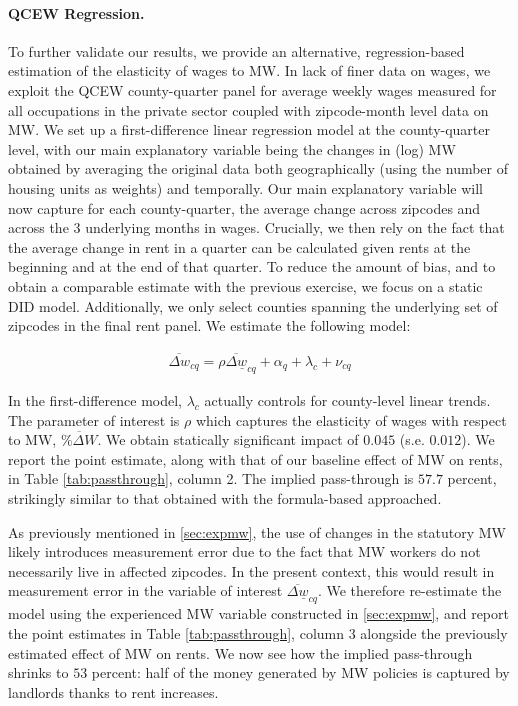 \paragraph{QCEW Regression.} To further validate our results, we provide an alternative, 
regression-based estimation of the elasticity of wages to MW. In lack of finer data on wages, 
we exploit the QCEW county-quarter panel for average weekly wages measured for all occupations 
in the private sector coupled with zipcode-month level data on MW. We set up a first-difference 
linear regression model at the county-quarter level, with our main explanatory variable being the 
changes in (log) MW obtained by averaging the original data both geographically (using the 
number of housing units as weights) and temporally. Our main explanatory variable will now capture 
for each county-quarter, the average change across zipcodes and across the 3 underlying months 
in wages. Crucially, we then rely on the fact that the average change in rent in a quarter can be calculated 
given rents at the beginning and at the end of that quarter. To reduce the amount of bias, and to obtain 
a comparable estimate with the previous exercise, we focus on a static DID model. Additionally, we only 
select counties spanning the underlying set of zipcodes in the final rent panel. We estimate the following model: 

\begin{align}
	\overline{\Delta w}_{cq} = \rho \overline{\Delta \underline{w}}_{cq} + \alpha_{q} + \lambda_{c} + \nu_{cq}
\end{align}

In the first-difference model, $\lambda_{c}$ actually controls for county-level linear trends. 
The parameter of interest is $\rho$ which captures the elasticity of wages with respect to 
MW, $\overline{\% \Delta W}$. We obtain statically significant impact of $0.045$ (s.e. $0.012$). 
We report the point estimate, along with that of our baseline effect of MW on rents, in 
Table \ref{tab:passthrough}, column 2. The implied pass-through is $57.7$ percent, 
strikingly similar to that obtained with the formula-based approached. 

As previously mentioned in \autoref{sec:expmw}, the use of changes in the statutory 
MW likely introduces measurement error due to the fact that MW workers do not necessarily 
live in affected zipcodes. In the present context, this would result in measurement error in 
the variable of interest $\overline{\Delta \underline{w}}_{cq}$. We therefore re-estimate the model 
using the experienced MW variable constructed in \autoref{sec:expmw}, and report the point 
estimates in Table \ref{tab:passthrough}, column 3 alongside the previously estimated effect 
of MW on rents. We now see how the implied pass-through shrinks to $53$ percent: half of 
the money generated by MW policies is captured by landlords thanks to rent increases. \\

